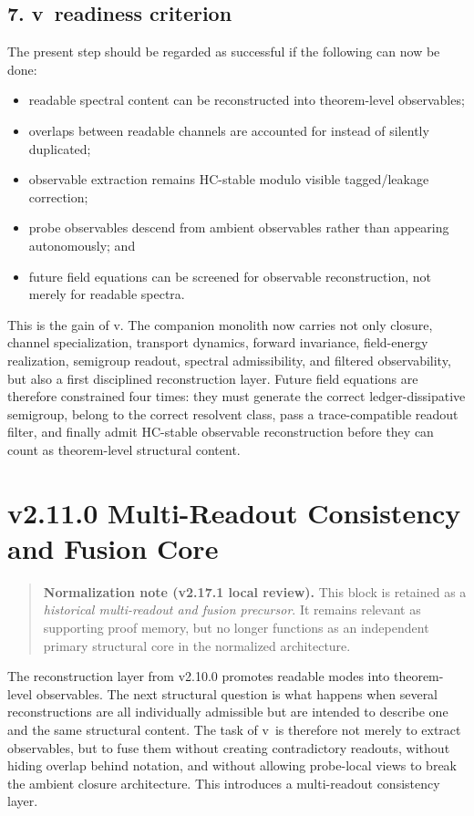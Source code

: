 \subsection*{7. v\docversion\ readiness criterion}
The present step should be regarded as successful if the following can now be done:
\begin{itemize}
  \item readable spectral content can be reconstructed into theorem-level observables;
  \item overlaps between readable channels are accounted for instead of silently duplicated;
  \item observable extraction remains HC-stable modulo visible tagged/leakage correction;
  \item probe observables descend from ambient observables rather than appearing autonomously; and
  \item future field equations can be screened for observable reconstruction, not merely for readable spectra.
\end{itemize}

This is the gain of v\docversion. The companion monolith now carries not only
closure, channel specialization, transport dynamics, forward invariance,
field-energy realization, semigroup readout, spectral admissibility, and filtered
observability, but also a first disciplined reconstruction layer. Future field
equations are therefore constrained four times: they must generate the correct
ledger-dissipative semigroup, belong to the correct resolvent class, pass a
trace-compatible readout filter, and finally admit HC-stable observable
reconstruction before they can count as theorem-level structural content.


\section*{v2.11.0 Multi-Readout Consistency and Fusion Core}

\begin{quote}
\textbf{Normalization note (v2.17.1 local review).}
This block is retained as a \emph{historical multi-readout and fusion precursor}. It remains relevant as supporting proof memory, but no longer functions as an independent primary structural core in the normalized architecture.
\end{quote}

The reconstruction layer from v2.10.0 promotes readable modes into theorem-level
observables. The next structural question is what happens when several
reconstructions are all individually admissible but are intended to describe one
and the same structural content. The task of v\docversion\ is therefore not merely
to extract observables, but to fuse them without creating contradictory readouts,
without hiding overlap behind notation, and without allowing probe-local views to
break the ambient closure architecture. This introduces a multi-readout
consistency layer.

